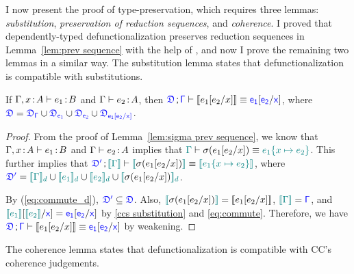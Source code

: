 
I now present the proof of type-preservation, which requires three lemmas: \textit{substitution}, \textit{preservation of reduction sequences}, and \textit{coherence}. I proved that dependently-typed defunctionalization preserves reduction sequences in Lemma~\ref{lem:prev sequence} with the help of {\ccs}, and now I prove the remaining two lemmas in a similar way. The substitution lemma states that defunctionalization is compatible with substitutions.

\begin{lemma}[Substitution] 
\label{lem:sub}
If $\Gamma, x \goodcolon A \vdash e_1 \goodcolon B$ and $\Gamma \vdash e_2 \goodcolon A$, then $\target{\fdef} \semicolon \target{\Gamma} \vdash \bbracket{e_1 \sub{e_2}{x}} \equiv \target{e_1}\sub{\target{e_2}}{\target{x}}$, where $\target{\fdef} = \target{\fdef_{\Gamma}} \cup \target{\fdef_{e_1}} \cup \target{\fdef_{e_2}} \cup \target{\fdef_{e_1\sub{e_2}{x}}}$.
\begin{proof}
From the proof of Lemma~\ref{lem:sigma prev sequence}, we know that
$\Gamma, x \goodcolon A \vdash e_1 \goodcolon B$ and $\Gamma \vdash e_2 \goodcolon A$ implies that $\helper{\Gamma} \vdash \sigma(e_1\sub{e_2}{x}) \equiv \helper{e_1\hsub{e_2}{x}}$. 
This further implies that $\target{\fdef'} \semicolon \hbracket{\helper{\Gamma}} \vdash \hbracket{\sigma(e_1\sub{e_2}{x})} \equiv \hbracket{\helper{e_1\hsub{e_2}{x}}}$, where 
$\target{\fdef'} = \hbracketd{\helper{\Gamma}} \cup \hbracketd{\helper{e_1}} \cup \hbracketd{\helper{e_2}} \cup \hbracketd{\sigma(e_1\sub{e_2}{x})}$.

By (\ref{eq:commute_d}), $\target{\fdef'} \subseteq \target{\fdef}$. Also, $\hbracket{\sigma(e_1\sub{e_2}{x})} = \bbracket{e_1\sub{e_2}{x}}$, $\hbracket{\helper{\Gamma}} = \target{\Gamma}$, and $\hbracket{\helper{e_1}}\sub{\hbracket{\helper{e_2}}}{\target{x}} = \target{e_1}\targetsub{e_2}{x}$ by \eqref{ccs substitution} and \eqref{eq:commute}. Therefore, we have $\target{\fdef} \semicolon \target{\Gamma} \vdash \bbracket{e_1 \sub{e_2}{x}} \equiv \target{e_1}\sub{\target{e_2}}{\target{x}}$ by weakening.
\end{proof}
\end{lemma}

The coherence lemma states that defunctionalization is compatible with CC's coherence judgements.

